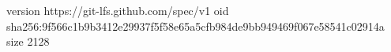 version https://git-lfs.github.com/spec/v1
oid sha256:9f566c1b9b3412e29937f5f58e65a5cfb984de9bb949469f067e58541c02914a
size 2128
